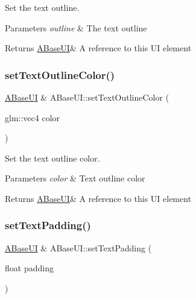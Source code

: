 Set the text outline. 


\begin{DoxyParams}{Parameters}
{\em outline} & The text outline \\
\hline
\end{DoxyParams}
\begin{DoxyReturn}{Returns}
\hyperlink{class_a_base_u_i}{A\+Base\+UI}\& A reference to this UI element 
\end{DoxyReturn}
\mbox{\label{class_a_base_u_i_a5490ceb10f7b8184d11bd4cd32a6adeb}} 
\subsubsection{\texorpdfstring{set\+Text\+Outline\+Color()}{setTextOutlineColor()}}
{\footnotesize\ttfamily \hyperlink{class_a_base_u_i}{A\+Base\+UI} \& A\+Base\+U\+I\+::set\+Text\+Outline\+Color (\begin{DoxyParamCaption}\item[{glm\+::vec4}]{color }\end{DoxyParamCaption})\hspace{0.3cm}{\ttfamily [virtual]}}



Set the text outline color. 


\begin{DoxyParams}{Parameters}
{\em color} & Text outline color \\
\hline
\end{DoxyParams}
\begin{DoxyReturn}{Returns}
\hyperlink{class_a_base_u_i}{A\+Base\+UI}\& A reference to this UI element 
\end{DoxyReturn}
\mbox{\label{class_a_base_u_i_ad414a59cf590b50f2d1f37891edf7284}} 
\subsubsection{\texorpdfstring{set\+Text\+Padding()}{setTextPadding()}}
{\footnotesize\ttfamily \hyperlink{class_a_base_u_i}{A\+Base\+UI} \& A\+Base\+U\+I\+::set\+Text\+Padding (\begin{DoxyParamCaption}\item[{float}]{padding }\end{DoxyParamCaption})\hspace{0.3cm}{\ttfamily [virtual]}}



